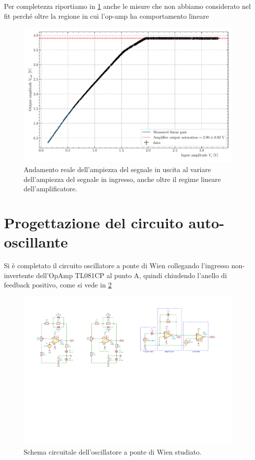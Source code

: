\documentclass[10pt, a4paper, italian]{article}
\begin{document}
Per completezza riportiamo in \cref{fig: gainsat} anche le misure che non
abbiamo considerato nel fit perché oltre la regione in cui l'op-amp ha
comportamento lineare
\begin{figure}[htbp]
\centering
\includegraphics[scale=0.7]{VoutVs}
\caption{Andamento reale dell'ampiezza del segnale in uscita al variare
dell'ampiezza del segnale in ingresso, anche oltre il regime lineare
dell'amplificatore. \label{fig: gainsat}}
\end{figure}

\section{Progettazione del circuito auto-oscillante}
Si è completato il circuito oscillatore a ponte di Wien collegando
l'ingresso non-invertente dell'OpAmp TL081CP al punto A, quindi chiudendo
l'anello di feedback positivo, come si vede in \cref{fig: wienschm}
\begin{figure}[htbp]
    \centering
	\includegraphics[scale=1.2]{wienschm}
    \caption{Schema circuitale dell'oscillatore a ponte di Wien studiato.
    \label{fig: wienschm}}
\end{figure}
\end{document}
